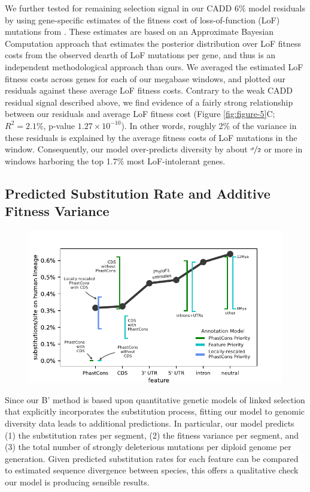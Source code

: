 \documentclass[11pt]{article}
\begin{document}
We further tested for remaining selection signal in our CADD 6\% model
residuals by using gene-specific estimates of the fitness cost of
loss-of-function (LoF) mutations from \textcite{Agarwal2023-un}. These
estimates are based on an Approximate Bayesian Computation approach that
estimates the posterior distribution over LoF fitness costs from the observed
dearth of LoF mutations per gene, and thus is an independent methodological
approach than ours. We averaged the estimated LoF fitness costs across genes
for each of our megabase windows, and plotted our residuals against these
average LoF fitness costs. Contrary to the weak CADD residual signal described
above, we find evidence of a fairly strong relationship between our residuals
and average LoF fitness cost (Figure \ref{fig:figure-5}C; $R^2 = 2.1\%$,
p-value $1.27 \times 10^{-10}$). In other words, roughly 2\% of the variance in
these residuals is explained by the average fitness costs of LoF mutations in
the window. Consequently, our model over-predicts diversity by about
$\nicefrac{\sigma}{2}$ or more in windows harboring the top 1.7\% most
LoF-intolerant genes.

\subsection*{Predicted Substitution Rate and Additive Fitness Variance}

\begin{figure}[htbp] \centering
    \includegraphics[width=\textwidth]{figures/figure_7_mod.pdf} 

    \caption{}

  \label{fig:figure-6}
\end{figure}

Since our B' method is based upon quantitative genetic models of linked
selection that explicitly incorporates the substitution process, fitting our
model to genomic diversity data leads to additional predictions. In particular,
our model predicts (1) the substitution rates per segment, (2) the fitness
variance per segment, and (3) the total number of strongly deleterious
mutations per diploid genome per generation. Given predicted substitution rates
for each feature can be compared to estimated sequence divergence between
species, this offers a qualitative check our model is producing sensible
results. 
\end{document}

